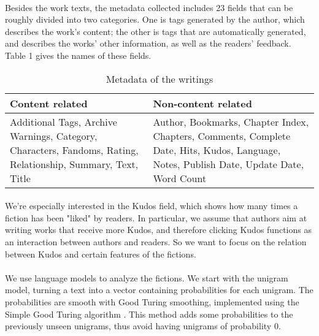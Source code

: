 \documentclass[11pt]{article} %
\begin{document}
\paragraph{} Besides the work texts, the metadata collected includes 23 fields that can be roughly divided into two categories. One is tags generated by the author, which describes the work’s content; the other is tags that are automatically generated, and describes the works’ other information, as well as the readers' feedback. Table 1 gives the names of these fields. 

\begin{table}[htdp]
\caption{Metadata of the writings}
\begin{center}
\begin{tabular}{p{7cm}|p{7cm}}
  \hline			
 Content related & Non-content related\\\hline
Additional Tags, Archive Warnings, Category, Characters, Fandoms, Rating, Relationship, Summary, Text, Title
&  Author, Bookmarks, Chapter Index, Chapters, Comments, Complete Date, Hits, Kudos, Language, Notes, Publish Date, Update Date, Word Count\\
\hline
\end{tabular}
\end{center}
\label{default}
\end{table}%

\paragraph{} We're especially interested in the Kudos field, which shows how many times a fiction has been "liked" by readers. In particular, we assume that authors aim at writing works that receive more Kudos, and therefore clicking Kudos functions as an interaction between authors and readers. So we want to focus on the relation between Kudos and certain features of the fictions.

\paragraph{} We use language models to analyze the fictions. We start with the unigram model, turning a text into a vector containing probabilities for each unigram. The probabilities are smooth with Good Turing smoothing, implemented using the Simple Good Turing algorithm \cite{gales1995good}. This method adds some probabilities to the previously unseen unigrams, thus avoid having unigrams of probability 0.
\end{document}
